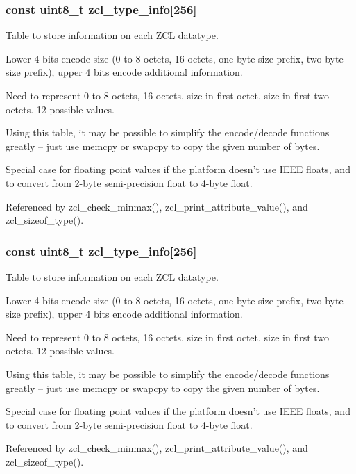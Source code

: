 \hypertarget{group__zcl__types_ga0f5737f60f1f37fb3b375e9fd5fe664d}{
\subsubsection[{zcl\-\_\-type\-\_\-info}]{\setlength{\rightskip}{0pt plus 5cm}const {\bf uint8\-\_\-t} zcl\-\_\-type\-\_\-info\mbox{[}256\mbox{]}}}\label{group__zcl__types_ga0f5737f60f1f37fb3b375e9fd5fe664d}


Table to store information on each Z\-C\-L datatype. 

Lower 4 bits encode size (0 to 8 octets, 16 octets, one-\/byte size prefix, two-\/byte size prefix), upper 4 bits encode additional information.

Need to represent 0 to 8 octets, 16 octets, size in first octet, size in first two octets. 12 possible values.

Using this table, it may be possible to simplify the encode/decode functions greatly -- just use memcpy or swapcpy to copy the given number of bytes.

Special case for floating point values if the platform doesn't use I\-E\-E\-E floats, and to convert from 2-\/byte semi-\/precision float to 4-\/byte float. 

Referenced by zcl\-\_\-check\-\_\-minmax(), zcl\-\_\-print\-\_\-attribute\-\_\-value(), and zcl\-\_\-sizeof\-\_\-type().

\hypertarget{group__zcl__types_ga0f5737f60f1f37fb3b375e9fd5fe664d}{
\subsubsection[{zcl\-\_\-type\-\_\-info}]{\setlength{\rightskip}{0pt plus 5cm}const {\bf uint8\-\_\-t} zcl\-\_\-type\-\_\-info\mbox{[}256\mbox{]}}}\label{group__zcl__types_ga0f5737f60f1f37fb3b375e9fd5fe664d}


Table to store information on each Z\-C\-L datatype. 

Lower 4 bits encode size (0 to 8 octets, 16 octets, one-\/byte size prefix, two-\/byte size prefix), upper 4 bits encode additional information.

Need to represent 0 to 8 octets, 16 octets, size in first octet, size in first two octets. 12 possible values.

Using this table, it may be possible to simplify the encode/decode functions greatly -- just use memcpy or swapcpy to copy the given number of bytes.

Special case for floating point values if the platform doesn't use I\-E\-E\-E floats, and to convert from 2-\/byte semi-\/precision float to 4-\/byte float. 

Referenced by zcl\-\_\-check\-\_\-minmax(), zcl\-\_\-print\-\_\-attribute\-\_\-value(), and zcl\-\_\-sizeof\-\_\-type().

